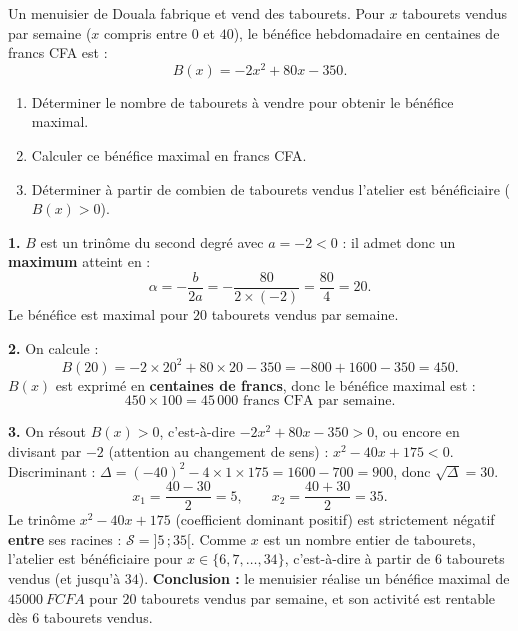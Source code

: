 \documentclass[11pt]{article}
\begin{document}
\begin{exoresolu}
Un menuisier de Douala fabrique et vend des tabourets. Pour $x$ tabourets vendus par semaine ($x$ compris entre $0$ et $40$), le bénéfice hebdomadaire en centaines de francs CFA est :
\[ B(x)=-2x^2+80x-350. \]
\begin{enumerate}
\item Déterminer le nombre de tabourets à vendre pour obtenir le bénéfice maximal.
\item Calculer ce bénéfice maximal en francs CFA.
\item Déterminer à partir de combien de tabourets vendus l'atelier est bénéficiaire ($B(x)>0$).
\end{enumerate}
\tcblower
\textbf{1.} $B$ est un trinôme du second degré avec $a=-2<0$ : il admet donc un \textbf{maximum} atteint en :
\[ \alpha=-\frac{b}{2a}=-\frac{80}{2\times(-2)}=\frac{80}{4}=20. \]
Le bénéfice est maximal pour $20$ tabourets vendus par semaine.

\textbf{2.} On calcule :
\[ B(20)=-2\times 20^2+80\times 20-350=-800+1600-350=450. \]
$B(x)$ est exprimé en \textbf{centaines de francs}, donc le bénéfice maximal est :
\[ 450\times 100 = 45\,000 \text{ francs CFA par semaine.} \]

\textbf{3.} On résout $B(x)>0$, c'est-à-dire $-2x^2+80x-350>0$, ou encore en divisant par $-2$ (attention au changement de sens) : $x^2-40x+175<0$.
Discriminant : $\Delta=(-40)^2-4\times 1\times 175=1600-700=900$, donc $\sqrt{\Delta}=30$.
\[ x_1=\frac{40-30}{2}=5, \qquad x_2=\frac{40+30}{2}=35. \]
Le trinôme $x^2-40x+175$ (coefficient dominant positif) est strictement négatif \textbf{entre} ses racines : $\mathcal{S}=]5\,;35[$.
Comme $x$ est un nombre entier de tabourets, l'atelier est bénéficiaire pour $x\in\{6,7,\dots,34\}$, c'est-à-dire à partir de $6$ tabourets vendus (et jusqu'à $34$).
\textbf{Conclusion :} le menuisier réalise un bénéfice maximal de $\SI{45000}{FCFA}$ pour $20$ tabourets vendus par semaine, et son activité est rentable dès $6$ tabourets vendus.
\end{exoresolu}
\end{document}
